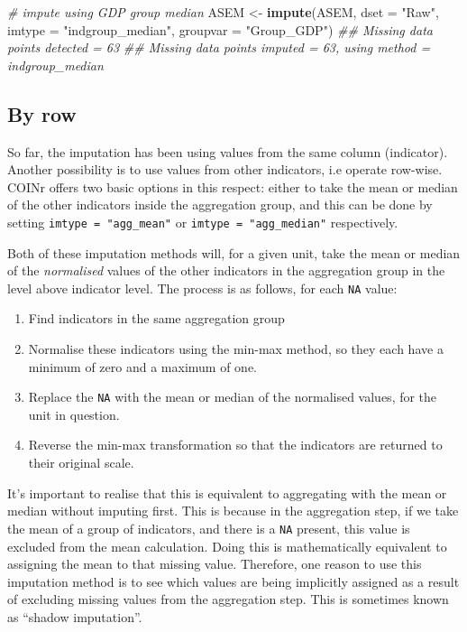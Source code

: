 \documentclass[
]{book}
\newenvironment{Shaded}{\begin{snugshade}}{\end{snugshade}}
\newcommand{\CommentTok}[1]{\textcolor[rgb]{0.56,0.35,0.01}{\textit{#1}}}
\newcommand{\DataTypeTok}[1]{\textcolor[rgb]{0.13,0.29,0.53}{#1}}
\newcommand{\KeywordTok}[1]{\textcolor[rgb]{0.13,0.29,0.53}{\textbf{#1}}}
\newcommand{\NormalTok}[1]{#1}
\newcommand{\StringTok}[1]{\textcolor[rgb]{0.31,0.60,0.02}{#1}}
\providecommand{\tightlist}{%
  \setlength{\itemsep}{0pt}\setlength{\parskip}{0pt}}
\begin{document}
\begin{Shaded}
\begin{Highlighting}[]
\CommentTok{# impute using GDP group median}
\NormalTok{ASEM <-}\StringTok{ }\KeywordTok{impute}\NormalTok{(ASEM, }\DataTypeTok{dset =} \StringTok{"Raw"}\NormalTok{, }\DataTypeTok{imtype =} \StringTok{"indgroup_median"}\NormalTok{, }\DataTypeTok{groupvar =} \StringTok{"Group_GDP"}\NormalTok{)}
\CommentTok{## Missing data points detected = 63}
\CommentTok{## Missing data points imputed = 63, using method = indgroup_median}
\end{Highlighting}
\end{Shaded}

\hypertarget{by-row}{%
\subsection{By row}\label{by-row}}

So far, the imputation has been using values from the same column (indicator). Another possibility is to use values from other indicators, i.e operate row-wise. COINr offers two basic options in this respect: either to take the mean or median of the other indicators inside the aggregation group, and this can be done by setting \texttt{imtype\ =\ "agg\_mean"} or \texttt{imtype\ =\ "agg\_median"} respectively.

Both of these imputation methods will, for a given unit, take the mean or median of the \emph{normalised} values of the other indicators in the aggregation group in the level above indicator level. The process is as follows, for each \texttt{NA} value:

\begin{enumerate}
\def\labelenumi{\arabic{enumi}.}
\tightlist
\item
  Find indicators in the same aggregation group
\item
  Normalise these indicators using the min-max method, so they each have a minimum of zero and a maximum of one.
\item
  Replace the \texttt{NA} with the mean or median of the normalised values, for the unit in question.
\item
  Reverse the min-max transformation so that the indicators are returned to their original scale.
\end{enumerate}

It's important to realise that this is equivalent to aggregating with the mean or median without imputing first. This is because in the aggregation step, if we take the mean of a group of indicators, and there is a \texttt{NA} present, this value is excluded from the mean calculation. Doing this is mathematically equivalent to assigning the mean to that missing value. Therefore, one reason to use this imputation method is to see which values are being implicitly assigned as a result of excluding missing values from the aggregation step. This is sometimes known as ``shadow imputation''.
\end{document}
